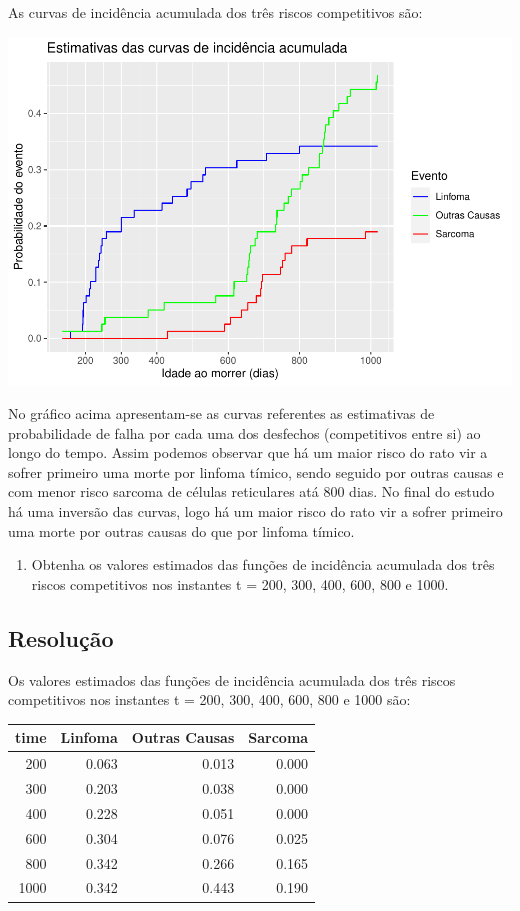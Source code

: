 \documentclass[]{article}
\providecommand{\tightlist}{%
  \setlength{\itemsep}{0pt}\setlength{\parskip}{0pt}}
\begin{document}
As curvas de incidência acumulada dos três riscos competitivos são:

\begin{center}\includegraphics[width=0.8\linewidth]{Lista_5_files/figure-latex/unnamed-chunk-18-1} \end{center}

No gráfico acima apresentam-se as curvas referentes as estimativas de
probabilidade de falha por cada uma dos desfechos (competitivos entre
si) ao longo do tempo. Assim podemos observar que há um maior risco do
rato vir a sofrer primeiro uma morte por linfoma tímico, sendo seguido
por outras causas e com menor risco sarcoma de células reticulares atá
800 dias. No final do estudo há uma inversão das curvas, logo há um
maior risco do rato vir a sofrer primeiro uma morte por outras causas do
que por linfoma tímico.

\begin{enumerate}
\def\labelenumi{(\alph{enumi})}
\setcounter{enumi}{1}
\tightlist
\item
  Obtenha os valores estimados das funções de incidência acumulada dos
  três riscos competitivos nos instantes t = 200, 300, 400, 600, 800 e
  1000.
\end{enumerate}

\subsection{Resolução}\label{resolucao-7}

Os valores estimados das funções de incidência acumulada dos três riscos
competitivos nos instantes t = 200, 300, 400, 600, 800 e 1000 são:

\begin{longtable}[]{@{}rrrr@{}}
\toprule
time & Linfoma & Outras Causas & Sarcoma\tabularnewline
\midrule
\endhead
200 & 0.063 & 0.013 & 0.000\tabularnewline
300 & 0.203 & 0.038 & 0.000\tabularnewline
400 & 0.228 & 0.051 & 0.000\tabularnewline
600 & 0.304 & 0.076 & 0.025\tabularnewline
800 & 0.342 & 0.266 & 0.165\tabularnewline
1000 & 0.342 & 0.443 & 0.190\tabularnewline
\bottomrule
\end{longtable}
\end{document}
